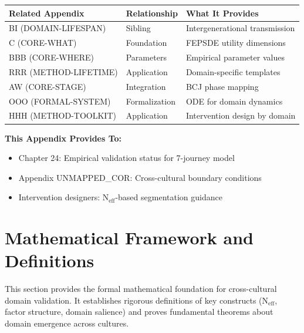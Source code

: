 \begin{tcolorbox}[colback=gray!5!white, colframe=gray!75!black, title=Cross-Reference Map]
\small
\begin{tabular}{@{}lll@{}}
\toprule
\textbf{Related Appendix} & \textbf{Relationship} & \textbf{What It Provides} \\
\midrule
BI (DOMAIN-LIFESPAN) & Sibling & Intergenerational transmission \\
C (CORE-WHAT) & Foundation & FEPSDE utility dimensions \\
BBB (CORE-WHERE) & Parameters & Empirical parameter values \\
RRR (METHOD-LIFETIME) & Application & Domain-specific templates \\
AW (CORE-STAGE) & Integration & BCJ phase mapping \\
OOO (FORMAL-SYSTEM) & Formalization & ODE for domain dynamics \\
HHH (METHOD-TOOLKIT) & Application & Intervention design by domain \\
\bottomrule
\end{tabular}

\vspace{0.5em}
\textbf{This Appendix Provides To:}
\begin{itemize}[nosep]
\item Chapter 24: Empirical validation status for 7-journey model
\item Appendix UNMAPPED_COR: Cross-cultural boundary conditions
\item Intervention designers: N$_{\text{eff}}$-based segmentation guidance
\end{itemize}
\end{tcolorbox}


\section{Mathematical Framework and Definitions}
\label{sec:bj-mathframework}

\begin{tcolorbox}[colback=blue!5!white, colframe=blue!75!black, title=Purpose of This Section]
This section provides the formal mathematical foundation for cross-cultural domain validation.
It establishes rigorous definitions of key constructs (N$_{\text{eff}}$, factor structure, domain
salience) and proves fundamental theorems about domain emergence across cultures.
\end{tcolorbox}

